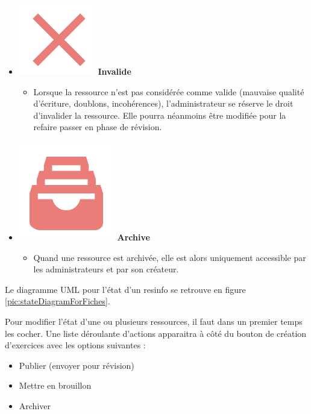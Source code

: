 \begin{itemize}
\begin{itemize}
    \end{itemize} 
    \item \includegraphics[valign=b,height=1.4\fontcharht\font`X]{images/client/not-validated.png} \textbf{Invalide}
    \begin{itemize}
        \item Lorsque la ressource n'est pas considérée comme valide (mauvaise qualité d'écriture, doublons, incohérences), l'administrateur se réserve le droit d'invalider la ressource. Elle pourra néanmoins être modifiée pour la refaire passer en phase de révision.
    \end{itemize}
    \item \includegraphics[valign=b,height=1.4\fontcharht\font`X]{images/client/archive.png} \textbf{Archive}
    \begin{itemize}
        \item Quand une ressource est archivée, elle est alors uniquement accessible par les administrateurs et par son créateur.
    \end{itemize}
\end{itemize}

Le diagramme UML pour l'état d'un \gls{resinfo} se retrouve en figure \ref{pic:stateDiagramForFiches}.


Pour modifier l'état d'une ou plusieurs ressources, il faut dans un premier temps les cocher. Une liste déroulante d'actions apparaitra à côté du bouton de création d'exercices avec les options suivantes :

\begin{itemize}
    \item Publier (envoyer pour révision)
    \item Mettre en brouillon
    \item Archiver
\end{itemize}

